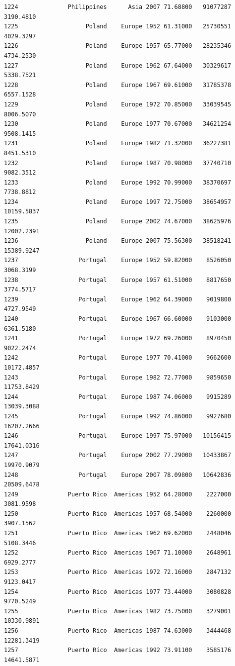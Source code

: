 \documentclass[
  letterpaper,
  DIV=11,
  numbers=noendperiod]{scrreprt}
\begin{document}
\begin{verbatim}
1224              Philippines      Asia 2007 71.68800   91077287   3190.4810
1225                   Poland    Europe 1952 61.31000   25730551   4029.3297
1226                   Poland    Europe 1957 65.77000   28235346   4734.2530
1227                   Poland    Europe 1962 67.64000   30329617   5338.7521
1228                   Poland    Europe 1967 69.61000   31785378   6557.1528
1229                   Poland    Europe 1972 70.85000   33039545   8006.5070
1230                   Poland    Europe 1977 70.67000   34621254   9508.1415
1231                   Poland    Europe 1982 71.32000   36227381   8451.5310
1232                   Poland    Europe 1987 70.98000   37740710   9082.3512
1233                   Poland    Europe 1992 70.99000   38370697   7738.8812
1234                   Poland    Europe 1997 72.75000   38654957  10159.5837
1235                   Poland    Europe 2002 74.67000   38625976  12002.2391
1236                   Poland    Europe 2007 75.56300   38518241  15389.9247
1237                 Portugal    Europe 1952 59.82000    8526050   3068.3199
1238                 Portugal    Europe 1957 61.51000    8817650   3774.5717
1239                 Portugal    Europe 1962 64.39000    9019800   4727.9549
1240                 Portugal    Europe 1967 66.60000    9103000   6361.5180
1241                 Portugal    Europe 1972 69.26000    8970450   9022.2474
1242                 Portugal    Europe 1977 70.41000    9662600  10172.4857
1243                 Portugal    Europe 1982 72.77000    9859650  11753.8429
1244                 Portugal    Europe 1987 74.06000    9915289  13039.3088
1245                 Portugal    Europe 1992 74.86000    9927680  16207.2666
1246                 Portugal    Europe 1997 75.97000   10156415  17641.0316
1247                 Portugal    Europe 2002 77.29000   10433867  19970.9079
1248                 Portugal    Europe 2007 78.09800   10642836  20509.6478
1249              Puerto Rico  Americas 1952 64.28000    2227000   3081.9598
1250              Puerto Rico  Americas 1957 68.54000    2260000   3907.1562
1251              Puerto Rico  Americas 1962 69.62000    2448046   5108.3446
1252              Puerto Rico  Americas 1967 71.10000    2648961   6929.2777
1253              Puerto Rico  Americas 1972 72.16000    2847132   9123.0417
1254              Puerto Rico  Americas 1977 73.44000    3080828   9770.5249
1255              Puerto Rico  Americas 1982 73.75000    3279001  10330.9891
1256              Puerto Rico  Americas 1987 74.63000    3444468  12281.3419
1257              Puerto Rico  Americas 1992 73.91100    3585176  14641.5871

\end{verbatim}
\end{document}
